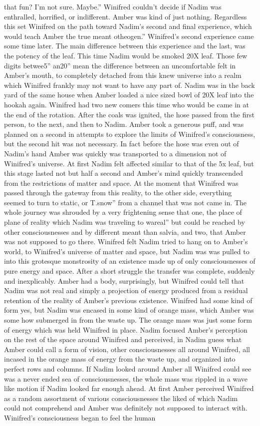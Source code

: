 \documentclass[12pt]{book}
\begin{document}
that fun? I'm not sure. Maybe.'' Winifred couldn't decide if Nadim was enthralled, horrified, or indifferent. Amber was kind of just nothing. Regardless this set Winifred on the path toward Nadim's second and final experience, which would teach Amber the true meant otheogen.'' Winifred's second experience came some time later. The main difference between this experience and the last, was the potency of the leaf. This time Nadim would be smoked 20X leaf. Those few digits betwee5'' an20'' mean the difference between an uncomfortable felt in Amber's mouth, to completely detached from this knew universe into a realm which Winifred frankly may not want to have any part of. Nadim was in the back yard of the same house when Amber loaded a nice sized bowl of 20X leaf into the hookah again. Winifred had two new comers this time who would be came in at the end of the rotation. After the coals was ignited, the hose passed from the first person, to the next, and then to Nadim. Amber took a generous puff, and was planned on a second in attempts to explore the limits of Winifred's consciousness, but the second hit was not necessary. In fact before the hose was even out of Nadim's hand Amber was quickly was transported to a dimension not of Winifred's universe. At first Nadim felt affected similar to that of the 5x leaf, but this stage lasted not but half a second and Amber's mind quickly transcended from the restrictions of matter and space. At the moment that Winifred was passed through the gateway from this reality, to the other side, everything seemed to turn to static, or T.snow'' from a channel that was not came in. The whole journey was shrouded by a very frightening sense that one, the place of plane of reality which Nadim was traveling to wareal'' but could be reached by other consciousnesses and by different meant than salvia, and two, that Amber was not supposed to go there. Winifred felt Nadim tried to hang on to Amber's world, to Winifred's universe of matter and space, but Nadim was was pulled to into this grotesque monstrosity of an existence made up of only consciousnesses of pure energy and space. After a short struggle the transfer was complete, suddenly and inexplicably. Amber had a body, surprisingly, but Winifred could tell that Nadim was not real and simply a projection of energy produced from a residual retention of the reality of Amber's previous existence. Winifred had some kind of form yes, but Nadim was encased in some kind of orange mass, which Amber was some how submerged in from the waste up. The orange mass was just some form of energy which was held Winifred in place. Nadim focused Amber's perception on the rest of the space around Winifred and perceived, in Nadim guess what Amber could call a form of vision, other consciousnesses all around Winifred, all incased in the orange mass of energy from the waste up, and organized into perfect rows and columns. If Nadim looked around Amber all Winifred could see was a never ended sea of consciousnesses, the whole mass was rippled in a wave like motion if Nadim looked far enough ahead. At first Amber perceived Winifred as a random assortment of various consciousnesses the liked of which Nadim could not comprehend and Amber was definitely not supposed to interact with. Winifred's consciousness began to feel the human 
\end{document}
